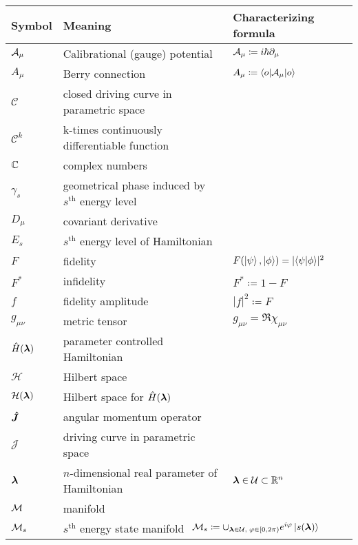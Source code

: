 

\vspace{-0pt}\begin{tabular} {@{}C{1.9cm}@{}p{8cm}@{}C{3.77cm}}
	\toprule
	\textbf{Symbol}& \textbf{Meaning}& \hspace{-30pt}\textbf{Characterizing formula}\\\bottomrule
	$\mathcal{A}_\mu$ & Calibrational (gauge) potential & $\mathcal{A}_\mu\coloneqq i\hbar \partial_\mu$ \\
	$A_\mu$ & Berry connection & $A_\mu\coloneqq \braket{o|\mathcal{A}_\mu|o}$ \\
	$\mathcal C$ & closed driving curve in parametric space &  \\
	$\mathcal{C}^k$ & k-times continuously differentiable function \\
	$\mathbb{C}$ & complex numbers & \\
	  $\gamma_s$& geometrical phase induced by $s^{\text{th}}$ energy level &  \\
	  $D_\mu$&covariant derivative  &  \\
	  $E_s$&$s^{\text{th}}$ energy level of Hamiltonian &  \\
	  $F$& fidelity & \hspace{-7pt}$F(\ket{\psi},\ket{\phi})=|\!\braket{\psi|\phi}\!|^2$  \\
	  $F^*$& infidelity & $F^*\coloneqq 1-F$  \\
	  $f$& fidelity amplitude  & $|f|^2\coloneqq F$  \\
	  $g_{\mu\nu}$& metric tensor& $g_{\mu\nu}= \Re\chi_{\mu\nu}$ \\
	  $\hat{H}({\bm\lambda})$& parameter controlled Hamiltonian  &  \\ 
	  $\mathcal H$& Hilbert space  &  \\ 
	  $\mathcal H({\bm\lambda})$& Hilbert space for $\hat{H}({\bm\lambda})$ &  \\ 
	  $\bm{\hat{J}}$ & angular momentum operator & \\
	  $\mathcal J$ & driving curve in parametric space &  \\
	  ${\bm\lambda}$& $n$-dimensional real parameter of Hamiltonian &${\bm\lambda}\in \mathcal U\subset \mathbb{R}^n$  \\
	  $\mathcal{M}$& manifold &  \\
	  $\mathcal{M}_s$& $s^{\text{th}}$ energy state manifold & $\hspace{-43pt}\M_s\coloneqq\cup_{\llambda\in\mathcal U,\;\varphi\in[0,2\pi)} e^{i\varphi}\ket{s(\llambda)}$ \\

\end{tabular}
